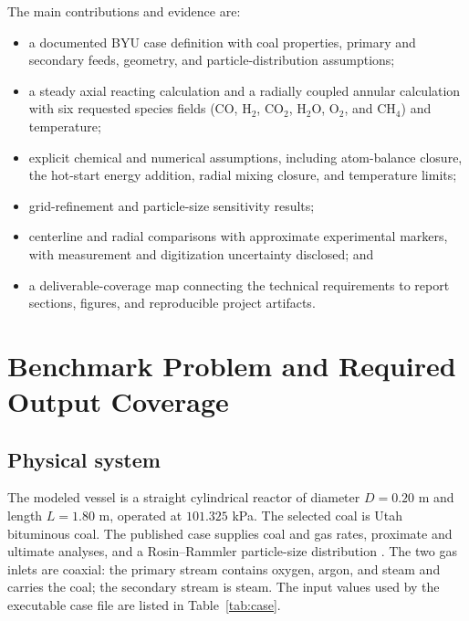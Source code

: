 \documentclass[journal]{IEEEtran}
\newcommand{\CO}{\mathrm{CO}}
\newcommand{\COtwo}{\mathrm{CO_2}}
\newcommand{\Htwo}{\mathrm{H_2}}
\newcommand{\HtwoO}{\mathrm{H_2O}}
\newcommand{\Otwo}{\mathrm{O_2}}
\newcommand{\CHfour}{\mathrm{CH_4}}
\begin{document}
The main contributions and evidence are:
\begin{itemize}
  \item a documented BYU case definition with coal properties, primary and secondary feeds, geometry, and particle-distribution assumptions;
  \item a steady axial reacting calculation and a radially coupled annular calculation with six requested species fields (\(\CO\), \(\Htwo\), \(\COtwo\), \(\HtwoO\), \(\Otwo\), and \(\CHfour\)) and temperature;
  \item explicit chemical and numerical assumptions, including atom-balance closure, the hot-start energy addition, radial mixing closure, and temperature limits;
  \item grid-refinement and particle-size sensitivity results;
  \item centerline and radial comparisons with approximate experimental markers, with measurement and digitization uncertainty disclosed; and
  \item a deliverable-coverage map connecting the technical requirements to report sections, figures, and reproducible project artifacts.
\end{itemize}

\section{Benchmark Problem and Required Output Coverage}
\subsection{Physical system}
The modeled vessel is a straight cylindrical reactor of diameter \(D=0.20\) m and length \(L=1.80\) m, operated at \(101.325\) kPa. The selected coal is Utah bituminous coal. The published case supplies coal and gas rates, proximate and ultimate analyses, and a Rosin--Rammler particle-size distribution \cite{mularski2021}. The two gas inlets are coaxial: the primary stream contains oxygen, argon, and steam and carries the coal; the secondary stream is steam. The input values used by the executable case file are listed in Table~\ref{tab:case}.
\end{document}
